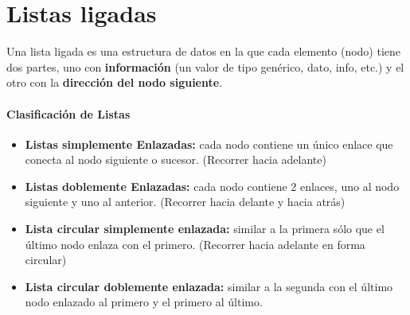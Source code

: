 \documentclass[10pt]{article}
\begin{document}
\section{Listas ligadas}
Una lista ligada es una estructura de datos en la que
cada elemento (nodo) tiene dos partes, uno con
\textbf{información} (un valor de tipo genérico, dato, info,
etc.) y el otro con la \textbf{dirección del nodo siguiente}.

\paragraph{Clasificación de Listas}

\begin{itemize}
	\item \textbf{Listas simplemente Enlazadas:} cada nodo contiene un único enlace
que conecta al nodo siguiente o sucesor. (Recorrer hacia adelante)
	\item \textbf{Listas doblemente Enlazadas:} cada nodo contiene 2 enlaces, uno al
nodo siguiente y uno al anterior. (Recorrer hacia delante y hacia
atrás)
	\item \textbf{Lista circular simplemente enlazada:} similar a la primera sólo que el
último nodo enlaza con el primero. (Recorrer hacia adelante en
forma circular)
	\item \textbf{Lista circular doblemente enlazada:} similar a la segunda con el
último nodo enlazado al primero y el primero al último.
\end{itemize}
\end{document}
